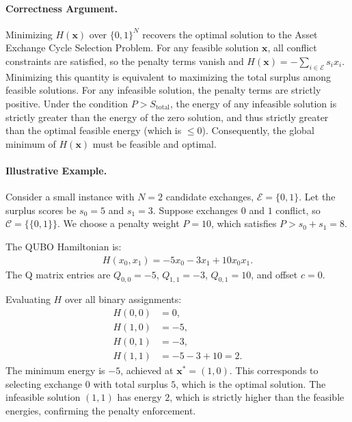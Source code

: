 \documentclass[12pt]{article}
\begin{document}
\paragraph{Correctness Argument.}
Minimizing $H(\mathbf{x})$ over $\{0, 1\}^N$ recovers the optimal solution to the Asset Exchange Cycle Selection Problem. For any feasible solution $\mathbf{x}$, all conflict constraints are satisfied, so the penalty terms vanish and $H(\mathbf{x}) = -\sum_{i \in \mathcal{E}} s_i x_i$. Minimizing this quantity is equivalent to maximizing the total surplus among feasible solutions. For any infeasible solution, the penalty terms are strictly positive. Under the condition $P > S_{\text{total}}$, the energy of any infeasible solution is strictly greater than the energy of the zero solution, and thus strictly greater than the optimal feasible energy (which is $\le 0$). Consequently, the global minimum of $H(\mathbf{x})$ must be feasible and optimal.

\paragraph{Illustrative Example.}
Consider a small instance with $N=2$ candidate exchanges, $\mathcal{E} = \{0, 1\}$. Let the surplus scores be $s_0 = 5$ and $s_1 = 3$. Suppose exchanges $0$ and $1$ conflict, so $\mathcal{C} = \{\{0, 1\}\}$. We choose a penalty weight $P = 10$, which satisfies $P > s_0 + s_1 = 8$.

The QUBO Hamiltonian is:
\begin{align}
    H(x_0, x_1) = -5x_0 - 3x_1 + 10x_0 x_1.
\end{align}
The Q matrix entries are $Q_{0,0} = -5$, $Q_{1,1} = -3$, $Q_{0,1} = 10$, and offset $c = 0$.

Evaluating $H$ over all binary assignments:
\begin{align}
    H(0, 0) &= 0, \\
    H(1, 0) &= -5, \\
    H(0, 1) &= -3, \\
    H(1, 1) &= -5 - 3 + 10 = 2.
\end{align}
The minimum energy is $-5$, achieved at $\mathbf{x}^* = (1, 0)$. This corresponds to selecting exchange $0$ with total surplus $5$, which is the optimal solution. The infeasible solution $(1, 1)$ has energy $2$, which is strictly higher than the feasible energies, confirming the penalty enforcement.
\end{document}
